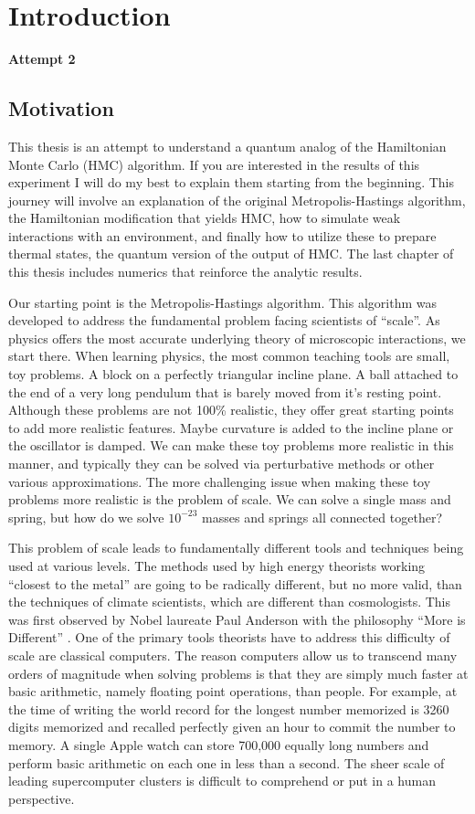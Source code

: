 \chapter{Introduction}

\textbf{Attempt 2}
\section{Motivation}
This thesis is an attempt to understand a quantum analog of the Hamiltonian Monte Carlo (HMC) algorithm. If you are interested in the results of this experiment I will do my best to explain them starting from the beginning. This journey will involve an explanation of the original Metropolis-Hastings algorithm, the Hamiltonian modification that yields HMC, how to simulate weak interactions with an environment, and finally how to utilize these to prepare thermal states, the quantum version of the output of HMC. The last chapter of this thesis includes numerics that reinforce the analytic results. 

Our starting point is the Metropolis-Hastings algorithm. This algorithm was developed to address the fundamental problem facing scientists of ``scale''. As physics offers the most accurate underlying theory of microscopic interactions, we start there. When learning physics, the most common teaching tools are small, toy problems. A block on a perfectly triangular incline plane. A ball attached to the end of a very long pendulum that is barely moved from it's resting point. Although these problems are not 100\% realistic, they offer great starting points to add more realistic features. Maybe curvature is added to the incline plane or the oscillator is damped. We can make these toy problems more realistic in this manner, and typically they can be solved via perturbative methods or other various approximations. The more challenging issue when making these toy problems more realistic is the problem of scale. We can solve a single mass and spring, but how do we solve $10^{-23}$ masses and springs all connected together? 

This problem of scale leads to fundamentally different tools and techniques being used at various levels. The methods used by high energy theorists working ``closest to the metal'' are going to be radically different, but no more valid, than the techniques of climate scientists, which are different than cosmologists. This was first observed by Nobel laureate Paul Anderson with the philosophy ``More is Different'' \cite{moreIsDifferent}. One of the primary tools theorists have to address this difficulty of scale are classical computers. The reason computers allow us to transcend many orders of magnitude when solving problems is that they are simply much faster at basic arithmetic, namely floating point operations, than people. For example, at the time of writing the world record for the longest number memorized is 3260 digits memorized and recalled perfectly given an hour to commit the number to memory. A single Apple watch can store 700,000 equally long numbers and perform basic arithmetic on each one in less than a second. The sheer scale of leading supercomputer clusters is difficult to comprehend or put in a human perspective. 

